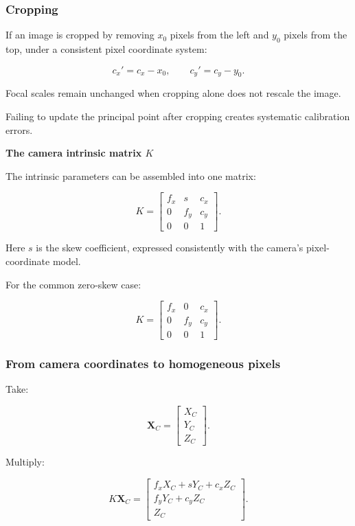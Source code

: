 \subsubsection{Cropping}\label{cropping}

If an image is cropped by removing \(x_0\) pixels from the left and \(y_0\) pixels from the top, under a consistent pixel coordinate system:

\[
 \boxed{ c_x'=c_x-x_0, \qquad c_y'=c_y-y_0 }.
\]

Focal scales remain unchanged when cropping alone does not rescale the image.

Failing to update the principal point after cropping creates systematic calibration errors.

\textbf{The camera intrinsic matrix \(K\)}

The intrinsic parameters can be assembled into one matrix:

\[
 \boxed{ K= \begin{bmatrix} f_x&s&c_x\\ 0&f_y&c_y\\ 0&0&1 \end{bmatrix} }.
\]

Here \(s\) is the skew coefficient, expressed consistently with the camera's pixel-coordinate model.

For the common zero-skew case:

\[
 \boxed{ K= \begin{bmatrix} f_x&0&c_x\\ 0&f_y&c_y\\ 0&0&1 \end{bmatrix} }.
\]

\subsubsection{From camera coordinates to homogeneous pixels}\label{from-camera-coordinates-to-homogeneous-pixels}

Take:

\[
 \mathbf X_C= \begin{bmatrix} X_C\\Y_C\\Z_C \end{bmatrix}.
\]

Multiply:

\[
 K\mathbf X_C= \begin{bmatrix} f_xX_C+sY_C+c_xZ_C\\ f_yY_C+c_yZ_C\\ Z_C \end{bmatrix}.
\]

